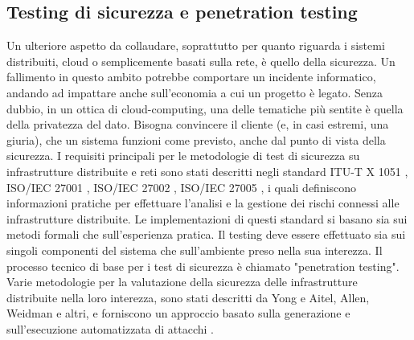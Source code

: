 \documentclass[../main.tex]{subfiles}
\begin{document}
\subsection{Testing di sicurezza e penetration testing}
Un ulteriore aspetto da collaudare, soprattutto per quanto riguarda i sistemi distribuiti, cloud o semplicemente basati sulla rete, è quello della sicurezza.
Un fallimento in questo ambito potrebbe comportare un incidente informatico, andando ad impattare anche sull'economia a cui un progetto è legato.
Senza dubbio, in un ottica di cloud-computing, una delle tematiche più sentite è quella della privatezza del dato. Bisogna convincere il cliente (e, in casi estremi, una giuria), che un sistema funzioni come previsto, anche dal punto di vista della sicurezza.
I requisiti principali per le metodologie di test di sicurezza su infrastrutture distribuite e reti sono stati descritti negli standard ITU-T X 1051 \cite{disttestITUTX1051}, ISO/IEC 27001 \cite{iso27001}, ISO/IEC 27002 \cite{iso27002}, ISO/IEC 27005 \cite{iso27005}, i quali definiscono informazioni pratiche per effettuare l'analisi e la gestione dei rischi connessi alle infrastrutture distribuite.
Le implementazioni di questi standard si basano sia sui metodi formali che sull'esperienza pratica. Il testing deve essere effettuato sia sui singoli componenti del sistema che sull'ambiente preso nella sua interezza.
Il processo tecnico di base per i test di sicurezza è chiamato "penetration testing".
Varie metodologie per la valutazione della sicurezza delle infrastrutture distribuite nella loro interezza, sono stati descritti da Yong e Aitel, Allen, Weidman e altri, e forniscono un approccio basato sulla generazione e sull'esecuzione automatizzata di attacchi \cite{disttest}.
\end{document}
